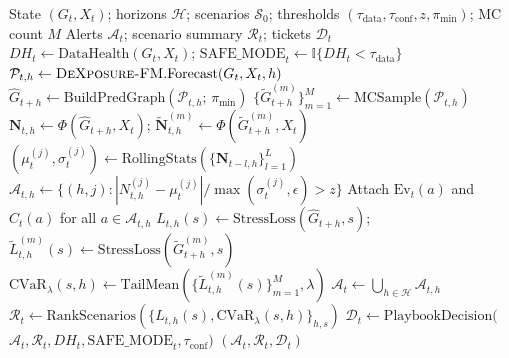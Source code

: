 \begin{algorithm}[!t]
\caption{DeXposure-Claw: one epoch}
\label{alg:agent_loop}
\begin{algorithmic}[1]
\Require State $(G_t,X_t)$; horizons $\mathcal{H}$; scenarios $\mathcal{S}_0$; thresholds $(\tau_{\mathrm{data}},\tau_{\mathrm{conf}},z,\pi_{\min})$; MC count $M$
\Ensure Alerts $\mathcal{A}_t$; scenario summary $\mathcal{R}_t$; tickets $\mathcal{D}_t$
\State $DH_t \gets \mathrm{DataHealth}(G_t,X_t)$;\; $\mathrm{SAFE\_MODE}_t \gets \mathbb{I}\{DH_t<\tau_{\mathrm{data}}\}$
    \State $\mathcal{P}_{t,h} \gets \textsc{DeXposure-FM}.\mathrm{Forecast}(G_t,X_t,h)$
    \State $\widehat{G}_{t+h} \gets \mathrm{BuildPredGraph}(\mathcal{P}_{t,h};\,\pi_{\min})$ 
    \State $\{\widetilde{G}^{(m)}_{t+h}\}_{m=1}^M \gets \mathrm{MCSample}(\mathcal{P}_{t,h})$ 
    \State $\mathbf{N}_{t,h} \gets \Phi(\widehat{G}_{t+h},X_t)$;\; $\widetilde{\mathbf{N}}^{(m)}_{t,h} \gets \Phi(\widetilde{G}^{(m)}_{t+h},X_t)$ 
    \State $(\mu^{(j)}_t,\sigma^{(j)}_t) \gets \mathrm{RollingStats}(\{\mathbf{N}_{t-l,h}\}_{l=1}^{L})$ 
    \State $\mathcal{A}_{t,h} \gets \{(h,j): |N^{(j)}_{t,h}-\mu^{(j)}_t|/\max(\sigma^{(j)}_t,\epsilon) > z\}$ 
    \State Attach $\mathrm{Ev}_t(a)$ and $C_t(a)$ for all $a\in\mathcal{A}_{t,h}$ 
        \State $L_{t,h}(s) \gets \mathrm{StressLoss}(\widehat{G}_{t+h}, s)$;\; $\widetilde{L}^{(m)}_{t,h}(s) \gets \mathrm{StressLoss}(\widetilde{G}^{(m)}_{t+h}, s)$
        \State $\mathrm{CVaR}_\lambda(s,h) \gets \mathrm{TailMean}(\{\widetilde{L}^{(m)}_{t,h}(s)\}_{m=1}^M, \lambda)$ 
    \EndFor
\EndFor
\State $\mathcal{A}_t \gets \bigcup_{h\in\mathcal{H}}\mathcal{A}_{t,h}$
\State $\mathcal{R}_t \gets \mathrm{RankScenarios}(\{L_{t,h}(s),\mathrm{CVaR}_\lambda(s,h)\}_{h,s})$
\State $\mathcal{D}_t \gets \mathrm{PlaybookDecision}($
\Statex \hspace{\algorithmicindent}$\mathcal{A}_t,\mathcal{R}_t,DH_t,\mathrm{SAFE\_MODE}_t,\tau_{\mathrm{conf}})$ 
\State \Return $(\mathcal{A}_t,\mathcal{R}_t,\mathcal{D}_t)$
\end{algorithmic}
\end{algorithm}
